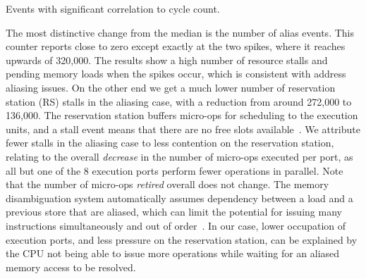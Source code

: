 \documentclass[10pt, conference, compsocconf]{IEEEtran}
\newcommand{\perfctr}[1] {
  {\lowercase{#1}}
}
\begin{document}
\begin{table}
  \centering
  \caption{Events with significant correlation to cycle count.\label{tab:loopcorrelation}}
  \pgfplotstabletypeset[
    int detect, %
    col sep=comma,
    columns={Performance counter, Median, [index]3}, %
    column type=r,
    columns/Performance counter/.style={
      string type, 
      column type=l,
      column type/.add={|}{},
      postproc cell content/.append code={
        \pgfkeysalso{@cell content=\perfctr{##1}}
      }
    },
    every head row/.style={
      output empty row,
      before row={\hline
        Performance counter & Median & Spike \\ %
      },
      after row=\hline\hline
    },
    every last row/.style={after row=\hline},
    every last column/.style={column type/.add={}{|}}
  ]{bin/microkernel-comparison-haswell.csv}
\end{table}

The most distinctive change from the median is the number of alias events.
This counter reports close to zero except exactly at the two spikes, where it reaches upwards of 320,000.
The results show a high number of resource stalls and pending memory loads when the spikes occur, which is consistent with address aliasing issues.
On the other end we get a much lower number of reservation station (RS) stalls in the aliasing case, with a reduction from around 272,000 to 136,000.
The reservation station buffers micro-ops for scheduling to the execution units, and a stall event means that there are no free slots available~\cite[Table 19-2]{Volume3B}.
We attribute fewer stalls in the aliasing case to less contention on the reservation station, 
relating to the overall \emph{decrease} in the number of micro-ops executed per port, as all but one of the 8 execution ports perform fewer operations in parallel.
Note that the number of micro-ops \emph{retired} overall does not change.
The memory disambiguation system automatically assumes dependency between a load and a previous store that are aliased, which can limit the potential for issuing many instructions simultaneously and out of order~\cite[Page 2-20]{OptimizationManual}.
In our case, lower occupation of execution ports, and less pressure on the reservation station, can be explained by the CPU not being able to issue more operations while waiting for an aliased memory access to be resolved.
\end{document}
